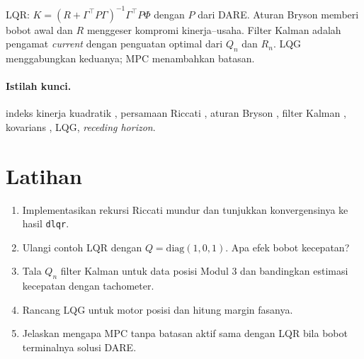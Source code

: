 \begin{ringkasan}
	LQR: $K = (R + \Gamma^\top P\Gamma)^{-1}\Gamma^\top P\Phi$ dengan $P$ dari DARE. Aturan Bryson memberi bobot awal dan $R$ menggeser kompromi kinerja--usaha. Filter Kalman adalah pengamat \textit{current} dengan penguatan optimal dari $Q_n$ dan $R_n$. LQG menggabungkan keduanya; MPC menambahkan batasan.\\[3pt]
\end{ringkasan}

\paragraph{Istilah kunci.} indeks kinerja kuadratik , persamaan Riccati , aturan Bryson , filter Kalman , kovarians , LQG, \textit{receding horizon}.

\section*{Latihan}
\begin{enumerate}
	\item Implementasikan rekursi Riccati mundur dan tunjukkan konvergensinya ke hasil \texttt{dlqr}.
	\item Ulangi contoh LQR dengan $Q = \text{diag}(1, 0{,}1)$. Apa efek bobot kecepatan?
	\item Tala $Q_n$ filter Kalman untuk data posisi Modul 3 dan bandingkan estimasi kecepatan dengan tachometer.
	\item Rancang LQG untuk motor posisi dan hitung margin fasanya.
	\item Jelaskan mengapa MPC tanpa batasan aktif sama dengan LQR bila bobot terminalnya solusi DARE.
\end{enumerate}
